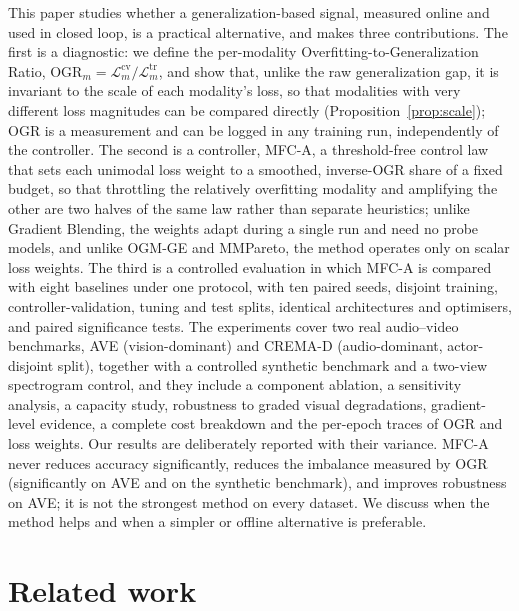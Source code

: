 \documentclass[fleqn,10pt]{wlscirep}
\newcommand{\Ltr}{\mathcal{L}^{\mathrm{tr}}}
\newcommand{\Lcv}{\mathcal{L}^{\mathrm{cv}}}
\newcommand{\OGR}{\mathrm{OGR}}
\begin{document}
This paper studies whether a generalization-based signal, measured online and used in closed loop, is a practical alternative, and makes three contributions. The first is a diagnostic: we define the per-modality Overfitting-to-Generalization Ratio, $\OGR_m=\Lcv_m/\Ltr_m$, and show that, unlike the raw generalization gap, it is invariant to the scale of each modality's loss, so that modalities with very different loss magnitudes can be compared directly (Proposition~\ref{prop:scale}); OGR is a measurement and can be logged in any training run, independently of the controller. The second is a controller, MFC-A, a threshold-free control law that sets each unimodal loss weight to a smoothed, inverse-OGR share of a fixed budget, so that throttling the relatively overfitting modality and amplifying the other are two halves of the same law rather than separate heuristics; unlike Gradient Blending, the weights adapt during a single run and need no probe models, and unlike OGM-GE and MMPareto, the method operates only on scalar loss weights. The third is a controlled evaluation in which MFC-A is compared with eight baselines under one protocol, with ten paired seeds, disjoint training, controller-validation, tuning and test splits, identical architectures and optimisers, and paired significance tests. The experiments cover two real audio--video benchmarks, AVE\cite{tian2018audio} (vision-dominant) and CREMA-D\cite{cao2014crema} (audio-dominant, actor-disjoint split), together with a controlled synthetic benchmark and a two-view spectrogram control, and they include a component ablation, a sensitivity analysis, a capacity study, robustness to graded visual degradations, gradient-level evidence, a complete cost breakdown and the per-epoch traces of OGR and loss weights.
Our results are deliberately reported with their variance. MFC-A never reduces accuracy significantly, reduces the imbalance measured by OGR (significantly on AVE and on the synthetic benchmark), and improves robustness on AVE; it is not the strongest method on every dataset. We discuss when the method helps and when a simpler or offline alternative is preferable.

\section*{Related work}
\end{document}
